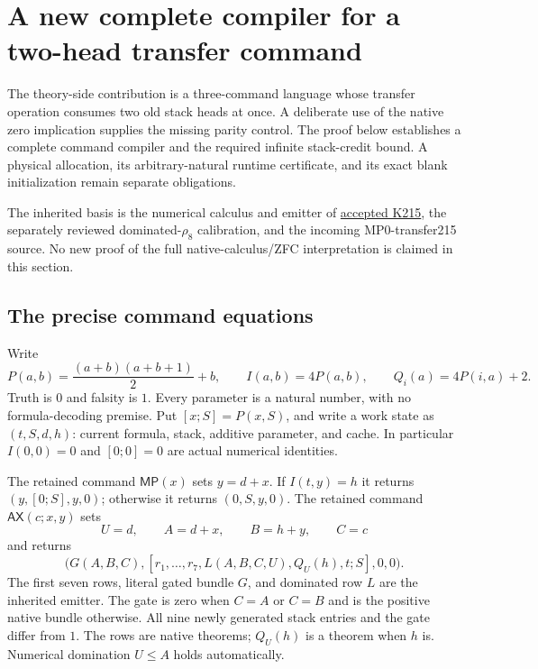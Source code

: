 \section{A new complete compiler for a two-head transfer command}
\label{sec:stride-two}

The theory-side contribution is a three-command language whose transfer
operation consumes two old stack heads at once. A deliberate use of the
native zero implication supplies the missing parity control. The proof below
establishes a complete command compiler and the required infinite stack-credit
bound. A physical allocation, its arbitrary-natural runtime certificate, and
its exact blank initialization remain separate obligations.

The inherited basis is the numerical calculus and emitter of
\href{https://github.com/VladimirReshetnikov/ProveIt/blob/75716498437bfc7291d5900cab2983a11fd54bac/Computability/BusyBeaver/Research/ZFC/candidate-k215/proof.md}{accepted K215},
the separately reviewed dominated-$\rho_8$ calibration, and the incoming
MP0-transfer215 source. No new proof of the full native-calculus/ZFC
interpretation is claimed in this section.

\subsection{The precise command equations}

Write
\[
 P(a,b)=\frac{(a+b)(a+b+1)}2+b,
 \qquad I(a,b)=4P(a,b),\qquad Q_i(a)=4P(i,a)+2.
\]
Truth is $0$ and falsity is $1$. Every parameter is a natural number, with
no formula-decoding premise. Put $[x;S]=P(x,S)$, and write a work state as
$(t,S,d,h)$: current formula, stack, additive parameter, and cache. In
particular $I(0,0)=0$ and $[0;0]=0$ are actual numerical identities.

The retained command $\mathsf{MP}(x)$ sets $y=d+x$. If $I(t,y)=h$ it
returns $(y,[0;S],y,0)$; otherwise it returns $(0,S,y,0)$. The retained
command $\mathsf{AX}(c;x,y)$ sets
\[
 U=d,\qquad A=d+x,\qquad B=h+y,\qquad C=c
\]
and returns
\[
 \bigl(G(A,B,C),[r_1,\ldots,r_7,L(A,B,C,U),Q_U(h),t;S],0,0\bigr).
\]
The first seven rows, literal gated bundle $G$, and dominated row $L$ are
the inherited emitter. The gate is zero when $C=A$ or $C=B$ and is the
positive native bundle otherwise. All nine newly generated stack entries
and the gate differ from $1$. The rows are native theorems; $Q_U(h)$ is
a theorem when $h$ is. Numerical domination $U\leq A$ holds automatically.

